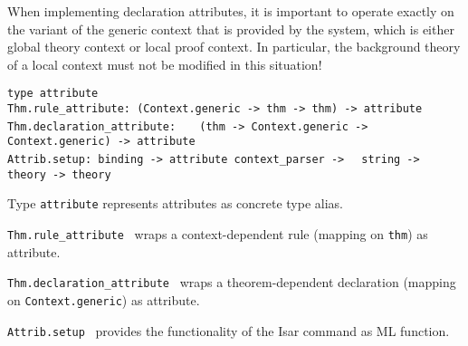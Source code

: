 \begin{isabellebody}
\begin{isamarkuptext}
  When implementing declaration attributes, it is important to operate
  exactly on the variant of the generic context that is provided by
  the system, which is either global theory context or local proof
  context.  In particular, the background theory of a local context
  must not be modified in this situation!%
\end{isamarkuptext}%
\isamarkuptrue%
%
\isadelimmlref
%
\endisadelimmlref
%
\isatagmlref
%
\begin{isamarkuptext}%
\begin{mldecls}
  \verb|type attribute| \\
  \verb|Thm.rule_attribute: (Context.generic -> thm -> thm) -> attribute| \\
  \verb|Thm.declaration_attribute: |\isasep\isanewline%
\verb|  (thm -> Context.generic -> Context.generic) -> attribute| \\
  \verb|Attrib.setup: binding -> attribute context_parser ->|\isasep\isanewline%
\verb|  string -> theory -> theory| \\
  \end{mldecls}

  \begin{description}

  \item Type \verb|attribute| represents attributes as concrete
  type alias.

  \item \verb|Thm.rule_attribute|~ wraps
  a context-dependent rule (mapping on \verb|thm|) as attribute.

  \item \verb|Thm.declaration_attribute|~
  wraps a theorem-dependent declaration (mapping on \verb|Context.generic|) as attribute.

  \item \verb|Attrib.setup|~ provides
  the functionality of the Isar command \hyperlink{command.attribute-setup}{\mbox{}} as
  ML function.


\end{description}
\end{isamarkuptext}
\end{isabellebody}
